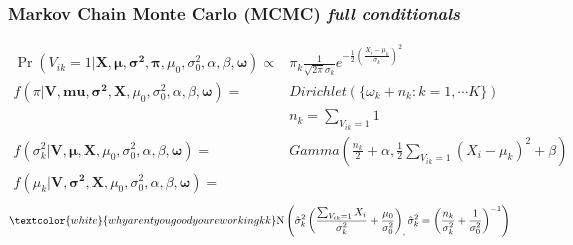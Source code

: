 \documentclass[xcolor={dvipsnames}]{beamer}
\begin{document}
\frame
{
 \frametitle{Markov Chain Monte Carlo (MCMC) \emph{full conditionals}}

\footnotesize

\begin{align*}
 \Pr(V_{ik}=1|\mathbf{X},\boldsymbol{\mu},\boldsymbol{\sigma^2}, \boldsymbol{\pi},\mu_0,\sigma_0^2,\alpha,\beta,\boldsymbol\omega) 
\propto{} & \pi_k \frac{1}{\sqrt{2\pi}\sigma_k} e^{-\frac{1}{2}\left(\frac{X_i - \mu_k}{\sigma_k}\right)^2}  \\
f(\pi|\mathbf{V},\boldsymbol{mu}, \boldsymbol{\sigma^2},\mathbf{X},\mu_0,\sigma_0^2,\alpha,\beta,\boldsymbol\omega) 
={} & Dirichlet(\{\omega_k+n_k: k = 1, \cdots K\}) \\
{} & n_k = \sum_{V_{ik}=1}1\\
f(\sigma_k^2|\mathbf{V},\boldsymbol{\mu},\mathbf{X},\mu_0,\sigma_0^2,\alpha,\beta,\boldsymbol\omega) = {}& 
 Gamma\left(\frac{n_k}{2}+\alpha,\frac{1}{2}\sum_{V_{ik}=1}(X_i-\mu_k)^2 + \beta \right) \\
f(\mu_k|\mathbf{V},\boldsymbol{\sigma^2},\mathbf{X},\mu_0,\sigma_0^2,\alpha,\beta,\boldsymbol\omega) =
\end{align*}
\vspace{-1em}
$$\textcolor{white}{why arent you good youre working kk}\text{N}\left(\hat \sigma^2_k\left(\frac{\sum_{V_{ik}=1}X_i}{\sigma^2_k} + \frac{\mu_0}{\sigma^2_0}\right)_, \hat \sigma^2_k =\left(\frac{n_k}{\sigma^2_k} + \frac{1}{\sigma^2_0}\right)^{-1} \right)$$

}
\end{document}

